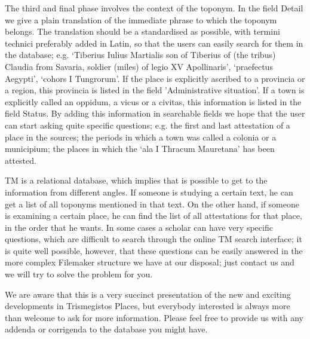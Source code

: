 \documentclass[amsthm,ebook]{saparticle}
\begin{document}
The third and final phase involves the context of the toponym. In the field Detail we give a plain translation of
the immediate phrase to which the toponym belongs. The translation should be a standardised as possible, with termini
technici preferably added in Latin, so that the users can easily search for them in the database; e.g. `Tiberius Iulius
Martialis son of Tiberius of (the tribus) Claudia from Savaria, soldier (miles) of legio XV Apollinaris', `praefectus
Aegypti', `cohors I Tungrorum'. If the place is explicitly ascribed to a provincia or a region, this provincia is
listed in the field 'Administrative situation'. If a town is explicitly called an oppidum, a vicus or a civitas, this
information is listed in the field Status. By adding this information in searchable fields we hope that the user can
start asking quite specific questions; e.g. the first and last attestation of a place in the sources; the periods in
which a town was called a colonia or a municipium; the places in which the `ala I Thracum Mauretana' has been attested.

 TM is a relational database, which implies that is possible to get to the information from different angles. If
someone is studying a certain text, he can get a list of all toponyms mentioned in that text. On the other hand, if
someone is examining a certain place, he can find the list of all attestations for that place, in the order that he
wants. In some cases a scholar can have very specific questions, which are difficult to search through the online TM
search interface; it is quite well possible, however, that these questions can be easily answered in the more complex
Filemaker structure we have at our disposal; just contact us and we will try to solve the problem for you.

We are aware that this is a very succinct presentation of the new and exciting developments in Trismegistos Places,
but everybody interested is always more than welcome to ask for more information. Please feel free to provide us with
any addenda or corrigenda to the database you might have.



\end{document}

